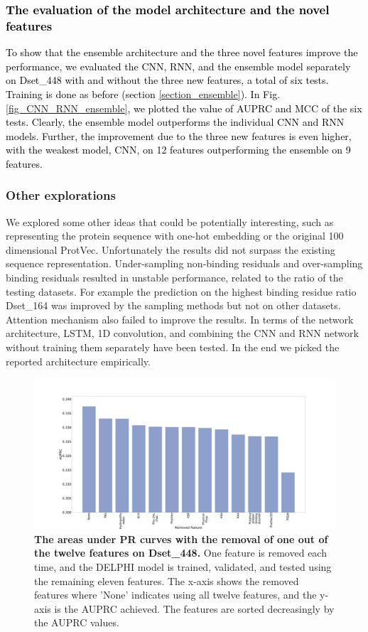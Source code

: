 \documentclass{bioinfo}
\newcommand{\myColor}{black}
\begin{document}
\textcolor{\myColor}{
\subsubsection{The evaluation of the model architecture and the novel features}
To show that the ensemble architecture and the three novel features improve the performance, we evaluated the CNN, RNN, and the ensemble model separately on Dset\_448 with and without the three new features, a total of six tests. Training is done as before (section \ref{section_ensemble}). In Fig. \ref{fig_CNN_RNN_ensemble}, we plotted the value of AUPRC and MCC of the six tests. Clearly, the ensemble model outperforms the individual CNN and RNN models. Further, the improvement due to the three new features is even higher, with the weakest model, CNN, on 12 features outperforming the ensemble on 9 features. }

\subsubsection{Other explorations}
We explored some other ideas that could be potentially interesting, such as representing the protein sequence with one-hot embedding or the original 100 dimensional ProtVec. Unfortunately the results did not surpass the existing sequence representation. Under-sampling non-binding residuals and over-sampling binding residuals resulted in unstable performance, related to the ratio of the testing datasets. For example the prediction on the highest binding residue ratio Dset\_164 was improved by the sampling methods but not on other datasets. Attention mechanism also failed to improve the results. In terms of the network architecture, LSTM, 1D convolution, and combining the CNN and RNN network without training them separately have been tested. In the end we picked the reported architecture empirically. 


\begin{figure}
\centering
\includegraphics[width=\columnwidth]{remove_features_individually_Testing.pdf}
  \caption{\textbf{The areas under PR curves with the removal of one out of the twelve features on Dset\_448.} One feature is removed each time, and the DELPHI model is trained, validated, and tested using the remaining eleven features. The x-axis shows the removed features where 'None' indicates using all twelve features, and the y-axis is the AUPRC achieved. The features are sorted decreasingly by the AUPRC values. 
  \label{fig_remove_each_feature}}
\end{figure}
\end{document}
